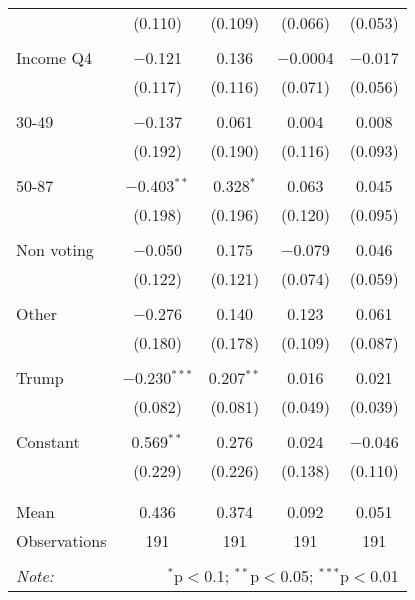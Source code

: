 \begin{tabular}{@{\extracolsep{5pt}}lcccc}
  & (0.110) & (0.109) & (0.066) & (0.053) \\ 
  & & & & \\ 
 Income Q4 & $-$0.121 & 0.136 & $-$0.0004 & $-$0.017 \\ 
  & (0.117) & (0.116) & (0.071) & (0.056) \\ 
  & & & & \\ 
 30-49 & $-$0.137 & 0.061 & 0.004 & 0.008 \\ 
  & (0.192) & (0.190) & (0.116) & (0.093) \\ 
  & & & & \\ 
 50-87 & $-$0.403$^{**}$ & 0.328$^{*}$ & 0.063 & 0.045 \\ 
  & (0.198) & (0.196) & (0.120) & (0.095) \\ 
  & & & & \\ 
 Non voting & $-$0.050 & 0.175 & $-$0.079 & 0.046 \\ 
  & (0.122) & (0.121) & (0.074) & (0.059) \\ 
  & & & & \\ 
 Other & $-$0.276 & 0.140 & 0.123 & 0.061 \\ 
  & (0.180) & (0.178) & (0.109) & (0.087) \\ 
  & & & & \\ 
 Trump & $-$0.230$^{***}$ & 0.207$^{**}$ & 0.016 & 0.021 \\ 
  & (0.082) & (0.081) & (0.049) & (0.039) \\ 
  & & & & \\ 
 Constant & 0.569$^{**}$ & 0.276 & 0.024 & $-$0.046 \\ 
  & (0.229) & (0.226) & (0.138) & (0.110) \\ 
  & & & & \\ 
\hline \\[-1.8ex] 
Mean & 0.436 & 0.374 & 0.092 & 0.051 \\ 
Observations & 191 & 191 & 191 & 191 \\ 
\hline 
\hline \\[-1.8ex] 
\textit{Note:}  & \multicolumn{4}{r}{$^{*}$p$<$0.1; $^{**}$p$<$0.05; $^{***}$p$<$0.01} \\ 
\end{tabular} 
